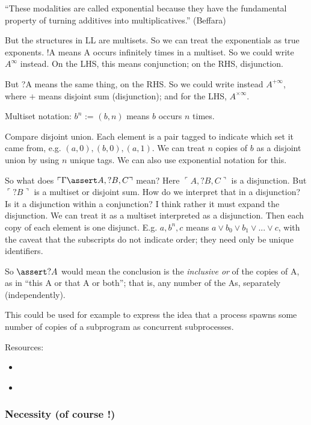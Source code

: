\documentclass{article}
\begin{document}
``These modalities are called exponential because they have the
fundamental property of turning additives into multiplicatives.''
(Beffara)

But the structures in LL are multisets. So we can treat the
exponentials as true exponents. !A means A occurs infinitely times in
a multiset. So we could write \(A^{\infty}\) instead. On the LHS, this
means conjunction; on the RHS, disjunction.

But ?A means the same thing, on the RHS. So we could write instead
\(A^{+\infty}\), where \(+\) means disjoint sum (disjunction); and for
the LHS, \(A^{\times\infty}\).

Multiset notation: \(b^n\) := \((b, n)\) means \(b\) occurs \(n\) times.

Compare disjoint union. Each element is a pair tagged to indicate
which set it came from, e.g. \({(a, 0), (b, 0), (a, 1)}\). We can
treat \(n\) copies of \(b\) as a disjoint union by using \(n\) unique
tags. We can also use exponential notation for this.

So what does \(\ulcorner\Gamma\linfer A,?B,C\urcorner\) mean? Here
\(\ulcorner A,?B,C\urcorner\) is a disjunction. But \(\ulcorner
?B\urcorner\) is a multiset or disjoint sum. How do we interpret that
in a disjunction? Is it a disjunction within a conjunction? I think
rather it must expand the disjunction. We can treat it as a multiset
interpreted as a disjunction. Then each copy of each element is one
disjunct. E.g. \({a,b^n,c}\) means \(a\lor b_0\lor b_1\lor ... \lor
c\), with the caveat that the subscripts do not indicate order; they
need only be unique identifiers.

So \(\linfer ?A\) would mean the conclusion is the \textit{inclusive
  or} of the copies of A, as in ``this A or that A or both''; that is, any number of the As, separately (independently).

This could be used for example to express the idea that a process
spawns some number of copies of a subprogram as concurrent
subprocesses.

Resources:

\begin{itemize}
\item {} \parencite{Tzouvaras_ll_multisets}
\item {} \parencite{Tzouvaras_logic_of_multisets}
\end{itemize}

\subsubsection{Necessity (of course !)}
\end{document}
